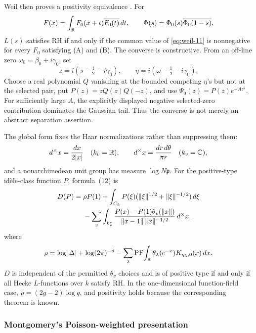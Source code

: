 Weil then proves a positivity equivalence
\cite[Collected Papers II, pp.~58--59]{weil1952}.  For
\begin{equation}
 F(x)=\int_\mathbb R F_0(x+t)\overline{F_0(t)}\,dt,
 \qquad
 \Phi(s)=\Phi_0(s)\overline{\Phi_0(1-\overline{s})},
 \label{eq:weil-positive-test}
\end{equation}
$L(s)$ satisfies RH if and only if the common value of \eqref{eq:weil-11} is nonnegative for
every $F_0$ satisfying (A) and (B).  The converse is constructive.  From an off-line zero
$\omega_0=\beta_0+i\gamma_0$, set
\[
 z=i(s-\tfrac12-i\gamma_0),\qquad
 \eta=i(\omega-\tfrac12-i\gamma_0).
\]
Choose a real polynomial $Q$ vanishing at the bounded competing $\eta$'s but not at the
selected pair, put $P(z)=zQ(z)Q(-z)$, and use
$\Psi_0(z)=P(z)e^{-Az^2}$.  For sufficiently large $A$, the explicitly displayed negative
selected-zero contribution dominates the Gaussian tail.  Thus the converse is not merely an
abstract separation assertion.

The global form fixes the Haar normalizations rather than suppressing them:
\[
 d^\times x=\frac{dx}{2|x|}\quad(k_v=\mathbb R),\qquad
 d^\times x=\frac{dr\,d\theta}{\pi r}\quad(k_v=\mathbb C),
\]
and a nonarchimedean unit group has measure $\log N\mathfrak p$.  For the positive-type
id\`ele-class function $P$, formula~(12) is
\cite[Collected Papers II, pp.~59--61, eqs.~(12)--(13)]{weil1952}
\begin{align}
 D(P)={}&\rho P(1)+\int_{C_k}P(\xi)
 (\|\xi\|^{1/2}+\|\xi\|^{-1/2})\,d\xi\notag\\
 &-\sum_v\int_{k_v^*}
 \frac{P(x)-P(1)\theta_v(\|x\|)}
 {\|x-1\|\,\|x\|^{-1/2}}\,d^\times x,
 \label{eq:weil-12}
\end{align}
where
\begin{equation}
 \rho=\log|\Delta|+\log(2\pi)^{-d}
 -\sum_\lambda\operatorname{PF}\!\int_\mathbb R
 \theta_\lambda(e^{-x})K_{\eta_\lambda,0}(x)\,dx.
 \label{eq:weil-13}
\end{equation}
$D$ is independent of the permitted $\theta_v$ choices and is of positive type if and only
if all Hecke $L$-functions over $k$ satisfy RH.  In the one-dimensional function-field case,
$\rho=(2g-2)\log q$, and positivity holds because the corresponding theorem is known.

\subsubsection{Montgomery's Poisson-weighted presentation}

